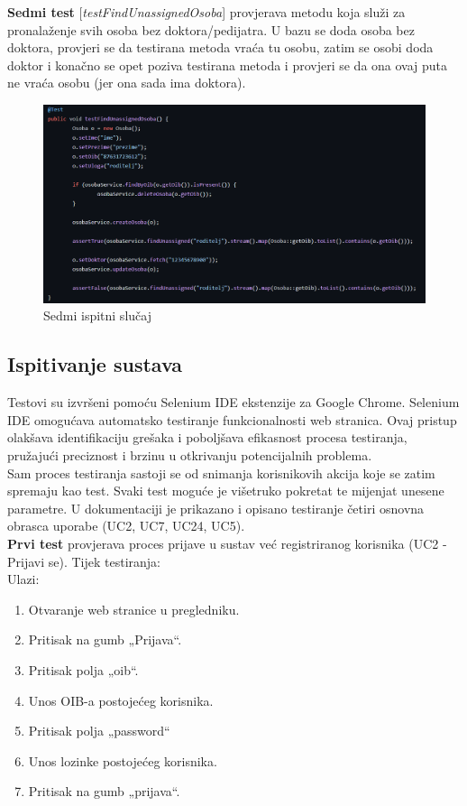 		 	\noindent \textbf{Sedmi test} [\textit{testFindUnassignedOsoba}] provjerava metodu koja služi za pronalaženje svih osoba bez doktora/pedijatra. U bazu se doda osoba bez doktora, provjeri se da testirana metoda vraća tu osobu, zatim se osobi doda doktor i konačno se opet poziva testirana metoda i provjeri se da ona ovaj puta ne vraća osobu (jer ona sada ima doktora). 
		 	\begin{figure}[H]
		 		\includegraphics[width=\textwidth]{slike/junit_7.png}
		 		\caption{Sedmi ispitni slučaj}
		 		\label{fig:junit_7}
		 	\end{figure}
			
			\subsection{Ispitivanje sustava}
			
			Testovi su izvršeni pomoću Selenium IDE ekstenzije za Google Chrome. Selenium IDE omogućava automatsko testiranje funkcionalnosti web stranica. Ovaj pristup olakšava identifikaciju grešaka i poboljšava efikasnost procesa testiranja, pružajući preciznost i brzinu u otkrivanju potencijalnih problema.\\ 
				Sam proces testiranja sastoji se od snimanja korisnikovih akcija koje se zatim spremaju kao test. Svaki test moguće je višetruko pokretat te mijenjat unesene parametre. U dokumentaciji je prikazano i opisano testiranje četiri osnovna obrasca uporabe (UC2, UC7, UC24, UC5).\\
			
			\noindent \textbf{Prvi test} provjerava proces prijave u sustav već registriranog korisnika (UC2 - Prijavi se). Tijek testiranja:\\
			Ulazi: 
			\begin{enumerate}
				\item Otvaranje web stranice u pregledniku.
				\item Pritisak na gumb „Prijava“.
				\item Pritisak polja „oib“.
				\item Unos OIB-a postojećeg korisnika.
				\item Pritisak polja „password“
				\item Unos lozinke postojećeg korisnika.
				\item Pritisak na gumb „prijava“.
			\end{enumerate}
			
